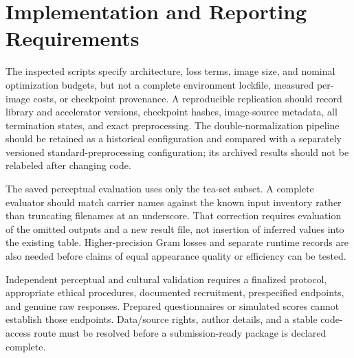 \documentclass[manuscript,acmlarge,screen,review]{acmart}
\begin{document}
\section{Implementation and Reporting Requirements}
\label{sec:repro}
The inspected scripts specify architecture, loss terms, image size, and nominal optimization budgets, but not a complete environment lockfile, measured per-image costs, or checkpoint provenance. A reproducible replication should record library and accelerator versions, checkpoint hashes, image-source metadata, all termination states, and exact preprocessing. The double-normalization pipeline should be retained as a historical configuration and compared with a separately versioned standard-preprocessing configuration; its archived results should not be relabeled after changing code.

The saved perceptual evaluation uses only the tea-set subset. A complete evaluator should match carrier names against the known input inventory rather than truncating filenames at an underscore. That correction requires evaluation of the omitted outputs and a new result file, not insertion of inferred values into the existing table. Higher-precision Gram losses and separate runtime records are also needed before claims of equal appearance quality or efficiency can be tested.

Independent perceptual and cultural validation requires a finalized protocol, appropriate ethical procedures, documented recruitment, prespecified endpoints, and genuine raw responses. Prepared questionnaires or simulated scores cannot establish those endpoints. Data/source rights, author details, and a stable code-access route must be resolved before a submission-ready package is declared complete.



\end{document}
